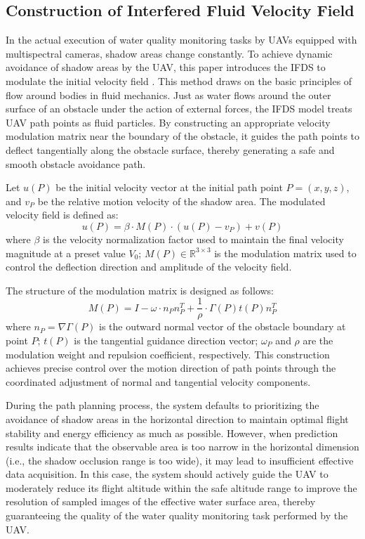 \documentclass[final,3p,times,numbers]{elsarticle}
\begin{document}
\subsection{Construction of Interfered Fluid Velocity Field}
\label{sec:ifds}
In the actual execution of water quality monitoring tasks by UAVs equipped with multispectral cameras, shadow areas change constantly. To achieve dynamic avoidance of shadow areas by the UAV, this paper introduces the IFDS to modulate the initial velocity field \cite{ref:68,ref:69}. This method draws on the basic principles of flow around bodies in fluid mechanics. Just as water flows around the outer surface of an obstacle under the action of external forces, the IFDS model treats UAV path points as fluid particles. By constructing an appropriate velocity modulation matrix near the boundary of the obstacle, it guides the path points to deflect tangentially along the obstacle surface, thereby generating a safe and smooth obstacle avoidance path.

Let $u(P)$ be the initial velocity vector at the initial path point $P=(x,y,z)$, and $v_P$ be the relative motion velocity of the shadow area. The modulated velocity field is defined as:
\begin{equation}
u(P) = \beta \cdot M(P) \cdot (u(P) - v_P) + v(P) \label{eq:3-8}
\end{equation}
where $\beta$ is the velocity normalization factor used to maintain the final velocity magnitude at a preset value $V_0$; $M(P) \in \mathbb{R}^{3 \times 3}$ is the modulation matrix used to control the deflection direction and amplitude of the velocity field.

The structure of the modulation matrix is designed as follows:
\begin{equation}
M(P) = I - \omega \cdot n_P n_P^T + \frac{1}{\rho} \cdot \Gamma(P) t(P) n_P^T \label{eq:3-9}
\end{equation}
where $n_P = \nabla \Gamma(P)$ is the outward normal vector of the obstacle boundary at point $P$; $t(P)$ is the tangential guidance direction vector; $\omega_P$ and $\rho$ are the modulation weight and repulsion coefficient, respectively. This construction achieves precise control over the motion direction of path points through the coordinated adjustment of normal and tangential velocity components.

During the path planning process, the system defaults to prioritizing the avoidance of shadow areas in the horizontal direction to maintain optimal flight stability and energy efficiency as much as possible. However, when prediction results indicate that the observable area is too narrow in the horizontal dimension (i.e., the shadow occlusion range is too wide), it may lead to insufficient effective data acquisition. In this case, the system should actively guide the UAV to moderately reduce its flight altitude within the safe altitude range to improve the resolution of sampled images of the effective water surface area, thereby guaranteeing the quality of the water quality monitoring task performed by the UAV.
\end{document}
